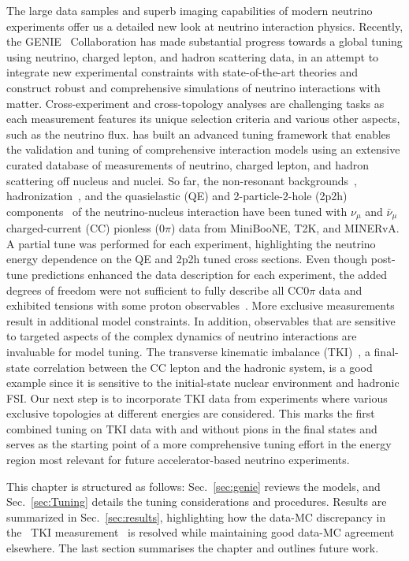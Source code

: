 The large data samples and superb imaging capabilities of modern neutrino experiments offer us a detailed new look at neutrino interaction physics. 
Recently, the GENIE~\cite{Andreopoulos:2009rq, GENIE:2021npt} Collaboration has made substantial progress towards a global tuning using neutrino, charged lepton, and hadron scattering data, in an attempt to integrate new experimental constraints with state-of-the-art theories and construct robust and comprehensive simulations of neutrino interactions with matter. 
Cross-experiment and cross-topology analyses are challenging tasks as each measurement features its unique selection criteria and various other aspects, such as the neutrino flux. 
\genie has built an advanced tuning framework that enables the validation and tuning of comprehensive interaction models using an extensive curated database of measurements of neutrino, charged lepton, and hadron scattering off nucleus and nuclei. 
So far, the non-resonant backgrounds~\cite{GENIE:2021zuu}, hadronization~\cite{GENIE:2021wox}, and the quasielastic (QE) and 2-particle-2-hole (2p2h) components~\cite{GENIE:2022qrc} of the neutrino-nucleus interaction have been tuned with $\nu_\mu$ and $\bar{\nu}_\mu$ charged-current (CC) pionless (0$\pi$) data from MiniBooNE, T2K, and MINERvA. 
A partial tune was performed for each experiment, highlighting the neutrino energy dependence on the QE and 2p2h tuned cross sections. 
Even though post-tune predictions enhanced the data description for each experiment, the added degrees of freedom were not sufficient to fully describe all CC0$\pi$ data and exhibited tensions with some proton observables~\cite{GENIE:2022qrc}. 
More exclusive measurements result in additional model constraints. 
In addition, observables that are sensitive to targeted aspects of the complex dynamics of neutrino interactions are invaluable for model tuning. 
The transverse kinematic imbalance (TKI)~\cite{Lu:2015hea, Lu:2015tcr}, a final-state correlation between the CC lepton and the hadronic system, is a good example since it is sensitive to the initial-state nuclear environment and hadronic FSI. 
Our next step is to incorporate TKI data from experiments where various exclusive topologies at different energies are considered. 
This marks the first combined tuning on TKI data with and without pions in the final states and serves as the starting point of a more comprehensive tuning effort in the energy region most relevant for future accelerator-based neutrino experiments.  

This chapter is structured as follows: 
Sec.~\ref{sec:genie} reviews the \genie models, and Sec.~\ref{sec:Tuning} details the tuning considerations and procedures. 
Results are summarized in Sec.~\ref{sec:results}, highlighting how the data-MC discrepancy in the \minpiz\ TKI measurement~\cite{MINERvA:2020anu} is resolved while maintaining good data-MC agreement elsewhere. 
The last section summarises the chapter and outlines future work.

